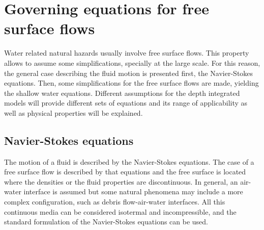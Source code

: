 
\chapter{Governing equations for free surface flows}
\label{equations}








Water related natural hazards usually involve free surface flows.
This property allows to assume some simplifications, specially at the large scale.
For this reason, the general case describing the fluid motion is presented first, the Navier-Stokes equations.
Then, some simplifications for the free surface flows are made, yielding the shallow water equations. Different assumptions for the depth integrated models will provide different sets of equations and its range of applicability as well as physical properties will be explained.




\section{Navier-Stokes equations}


The motion of a fluid is described by the Navier-Stokes equations. The case of a free surface flow is described by that equations and the free surface is located where the densities or the fluid properties are discontinuous. In general, an air-water interface is assumed but some natural phenomena may include a more complex configuration, such as debris flow-air-water interfaces. All this continuous media can be considered isotermal and incompressible, and the standard formulation of the Navier-Stokes equations can be used.

